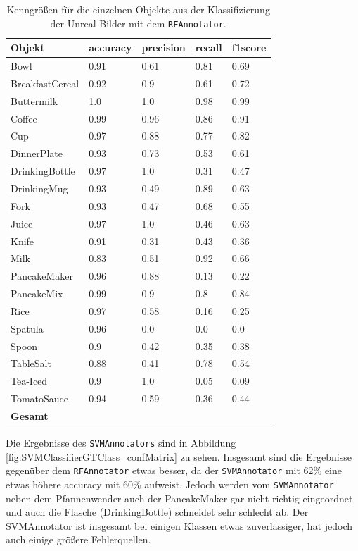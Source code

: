\begin{table}
\begin{tabularx}{\textwidth}{Xllll}
\textbf{Objekt}	& \textbf{\gls{accuracy}} & \textbf{\gls{precision}}	& \textbf{\gls{recall}}	& \textbf{\gls{f1score}} \\ \hline
Bowl & 0.91 & 0.61 & 0.81 & 0.69 \\  
BreakfastCereal & 0.92 & 0.9 & 0.61 & 0.72 \\  
Buttermilk & 1.0 & 1.0 & 0.98 & 0.99 \\  
Coffee & 0.99 & 0.96 & 0.86 & 0.91 \\  
Cup & 0.97 & 0.88 & 0.77 & 0.82 \\  
DinnerPlate & 0.93 & 0.73 & 0.53 & 0.61 \\  
DrinkingBottle & 0.97 & 1.0 & 0.31 & 0.47 \\  
DrinkingMug & 0.93 & 0.49 & 0.89 & 0.63 \\  
Fork & 0.93 & 0.47 & 0.68 & 0.55 \\  
Juice & 0.97 & 1.0 & 0.46 & 0.63 \\  
Knife & 0.91 & 0.31 & 0.43 & 0.36 \\  
Milk & 0.83 & 0.51 & 0.92 & 0.66 \\  
PancakeMaker & 0.96 & 0.88 & 0.13 & 0.22 \\  
PancakeMix & 0.99 & 0.9 & 0.8 & 0.84 \\  
Rice & 0.97 & 0.58 & 0.16 & 0.25 \\  
Spatula & 0.96 & 0.0 & 0.0 & 0.0 \\  
Spoon & 0.9 & 0.42 & 0.35 & 0.38 \\  
TableSalt & 0.88 & 0.41 & 0.78 & 0.54 \\  
Tea-Iced & 0.9 & 1.0 & 0.05 & 0.09 \\  
TomatoSauce & 0.94 & 0.59 & 0.36 & 0.44 \\  \hline
\textbf{Gesamt}		&	   &	  &      &       \\
\end{tabularx}
\caption[Objekt-spezifische Kenngrößen des RFAnnotators]{Kenngrößen für die einzelnen Objekte aus der Klassifizierung der Unreal-Bilder mit dem \texttt{RFAnnotator}.}
\label{tab:RFClassifierGTClass_metrics}
\end{table}

Die Ergebnisse des \texttt{SVMAnnotators} sind in Abbildung  \ref{fig:SVMClassifierGTClass_confMatrix} zu sehen. Insgesamt sind die Ergebnisse gegenüber dem \texttt{RFAnnotator} etwas besser, da der \texttt{SVMAnnotator} mit 62\% eine etwas höhere \gls{accuracy} mit 60\% aufweist. Jedoch werden vom \texttt{SVMAnnotator} neben dem Pfannenwender auch der PancakeMaker gar nicht richtig eingeordnet und auch die Flasche (DrinkingBottle) schneidet sehr schlecht ab. Der SVMAnnotator ist insgesamt bei einigen Klassen etwas zuverlässiger, hat jedoch auch einige größere Fehlerquellen. 

